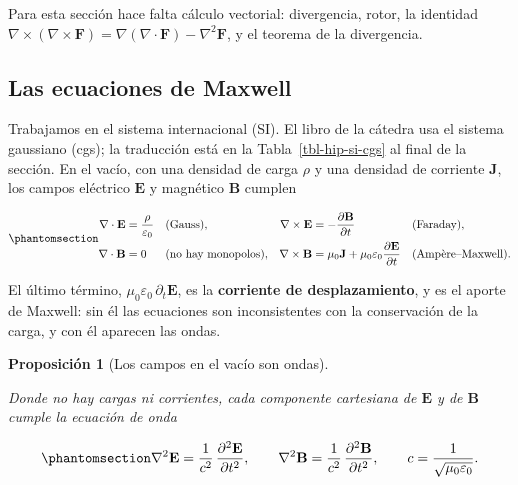 \documentclass[
  spanish,
  a4paper,
]{scrbook}
\theoremstyle{definition}
\theoremstyle{plain}
\newtheorem{proposition}{Proposición}[chapter]
\theoremstyle{definition}
\theoremstyle{plain}
\theoremstyle{definition}
\theoremstyle{remark}
\begin{document}
Para esta sección hace falta cálculo vectorial: divergencia, rotor, la
identidad
\(\nabla\times(\nabla\times\mathbf F) = \nabla(\nabla\cdot\mathbf F) - \nabla^2\mathbf F\),
y el teorema de la divergencia.

\subsection{Las ecuaciones de Maxwell}\label{sec-hip-maxwell-ec}

Trabajamos en el sistema internacional (SI). El libro de la cátedra usa
el sistema gaussiano (cgs); la traducción está en la
Tabla~\ref{tbl-hip-si-cgs} al final de la sección. En el vacío, con una
densidad de carga \(\rho\) y una densidad de corriente \(\mathbf J\),
los campos eléctrico \(\mathbf E\) y magnético \(\mathbf B\) cumplen

\begin{equation}\protect\phantomsection\label{eq-hip-maxwell}{
\begin{aligned}
\nabla\cdot\mathbf E &= \frac{\rho}{\varepsilon_0} && \text{(Gauss)}, &
\nabla\times\mathbf E &= -\frac{\partial\mathbf B}{\partial t} && \text{(Faraday)},\\
\nabla\cdot\mathbf B &= 0 && \text{(no hay monopolos)}, &
\nabla\times\mathbf B &= \mu_0\mathbf J + \mu_0\varepsilon_0\frac{\partial\mathbf E}{\partial t} && \text{(Ampère–Maxwell)}.
\end{aligned}
}\end{equation}

El último término, \(\mu_0\varepsilon_0\,\partial_t\mathbf E\), es la
\textbf{corriente de desplazamiento}, y es el aporte de Maxwell: sin él
las ecuaciones son inconsistentes con la conservación de la carga, y con
él aparecen las ondas.

\begin{proposition}[Los campos en el vacío son
ondas]\protect\hypertarget{prp-hip-ondas-em}{}\label{prp-hip-ondas-em}

Donde no hay cargas ni corrientes, cada componente cartesiana de
\(\mathbf E\) y de \(\mathbf B\) cumple la ecuación de onda

\begin{equation}\protect\phantomsection\label{eq-hip-ondas-em}{
\nabla^2\mathbf E = \frac{1}{c^2}\,\frac{\partial^2\mathbf E}{\partial t^2},\qquad
\nabla^2\mathbf B = \frac{1}{c^2}\,\frac{\partial^2\mathbf B}{\partial t^2},\qquad
c = \frac{1}{\sqrt{\mu_0\varepsilon_0}} .
}\end{equation}

\end{proposition}
\end{document}
